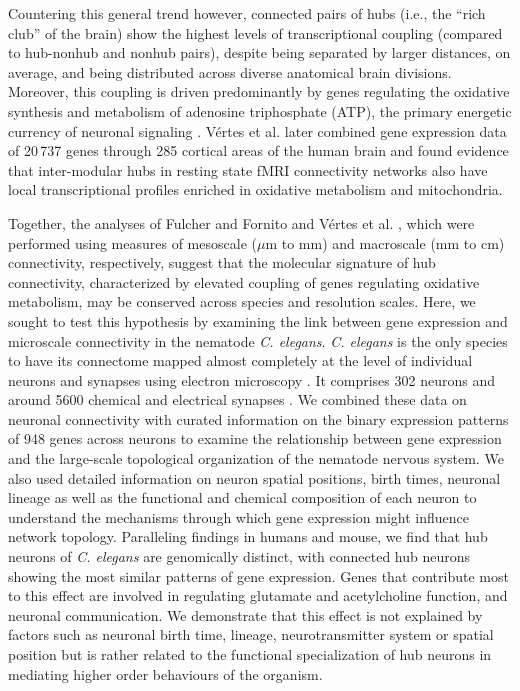 \documentclass[10pt,letterpaper]{article}
\begin{document}
Countering this general trend however, connected pairs of hubs (i.e., the ``rich club'' of the brain) show the highest levels of transcriptional coupling (compared to hub-nonhub and nonhub pairs), despite being separated by larger distances, on average, and being distributed across diverse anatomical brain divisions.
Moreover, this coupling is driven predominantly by genes regulating the oxidative synthesis and metabolism of adenosine triphosphate (ATP), the primary energetic currency of neuronal signaling \cite{Lennie:2003ia, Laughlin:2003vu}.
V\'ertes et al. \cite{Vertes2016a} later combined gene expression data of 20\,737 genes through 285 cortical areas of the human brain and found evidence that inter-modular hubs in resting state fMRI connectivity networks also have local transcriptional profiles enriched in oxidative metabolism and mitochondria.

Together, the analyses of Fulcher and Fornito \cite{Fulcher:2016ck} and V\'ertes et al. \cite{Vertes2016a}, which were performed using measures of mesoscale ($\mu$m to mm) and macroscale (mm to cm) connectivity, respectively, suggest that the molecular signature of hub connectivity, characterized by elevated coupling of genes regulating oxidative metabolism, may be conserved across species and resolution scales.
Here, we sought to test this hypothesis by examining the link between gene expression and microscale connectivity in the nematode \emph{C. elegans}.
\emph{C. elegans} is the only species to have its connectome mapped almost completely at the level of individual neurons and synapses using electron microscopy \cite{White:1986tx, Varshney2011}.
It comprises 302 neurons and around 5600 chemical and electrical synapses \cite{White:1986tx}.
We combined these data on neuronal connectivity with curated information on the binary expression patterns of 948 genes across neurons to examine the relationship between gene expression and the large-scale topological organization of the nematode nervous system.
We also used detailed information on neuron spatial positions, birth times, neuronal lineage as well as the functional and chemical composition of each neuron to understand the mechanisms through which gene expression might influence network topology.
Paralleling findings in humans and mouse, we find that hub neurons of \emph{C. elegans} are genomically distinct, with connected hub neurons showing the most similar patterns of gene expression.
Genes that contribute most to this effect are involved in regulating glutamate and acetylcholine function, and neuronal communication.
We demonstrate that this effect is not explained by factors such as neuronal birth time, lineage, neurotransmitter system or spatial position but is rather related to the functional specialization of hub neurons in mediating higher order behaviours of the organism.
\end{document}
